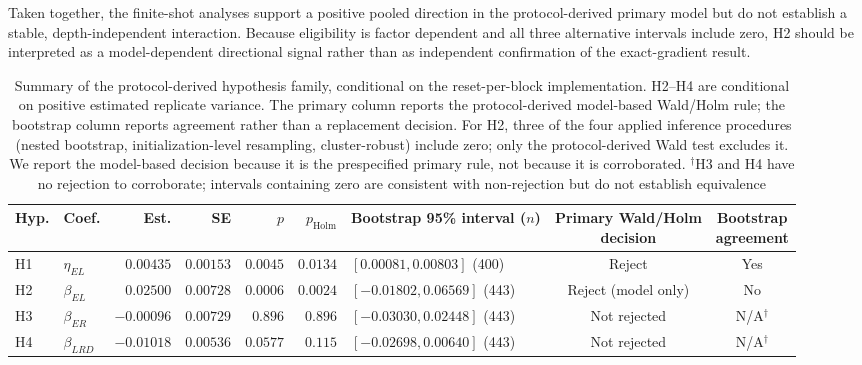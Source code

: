 \documentclass[pdflatex,sn-basic,Numbered]{sn-jnl}
\begin{document}
Taken together, the finite-shot analyses support a positive pooled direction in the protocol-derived primary model but do not establish a stable, depth-independent interaction. Because eligibility is factor dependent and all three alternative intervals include zero, H2 should be interpreted as a model-dependent directional signal rather than as independent confirmation of the exact-gradient result.

\begin{table}[t]
\centering
\footnotesize
\setlength{\tabcolsep}{3pt}
\renewcommand{\arraystretch}{1.12}
\begin{tabularx}{\textwidth}{@{}llrrrr>{\raggedright\arraybackslash}Xcc@{}}
\toprule
Hyp. & Coef. & Est. & SE & $p$ & $p_{\mathrm{Holm}}$ & Bootstrap 95\% interval ($n$) & \shortstack{Primary Wald/Holm\\decision} & \shortstack{Bootstrap\\agreement} \\
\midrule
H1 & $\eta_{EL}$ & $0.00435$ & $0.00153$ & $0.0045$ & $0.0134$ & $[0.00081,0.00803]$ (400) & Reject & Yes \\
H2 & $\beta_{EL}$ & $0.02500$ & $0.00728$ & $0.0006$ & $0.0024$ & $[-0.01802,0.06569]$ (443) & Reject (model only) & No \\
H3 & $\beta_{ER}$ & $-0.00096$ & $0.00729$ & $0.896$ & $0.896$ & $[-0.03030,0.02448]$ (443) & Not rejected & N/A$^\dagger$ \\
H4 & $\beta_{LRD}$ & $-0.01018$ & $0.00536$ & $0.0577$ & $0.115$ & $[-0.02698,0.00640]$ (443) & Not rejected & N/A$^\dagger$ \\
\bottomrule
\end{tabularx}
\caption{Summary of the protocol-derived hypothesis family, conditional on the reset-per-block implementation. H2--H4 are conditional on positive estimated replicate variance. The primary column reports the protocol-derived model-based Wald/Holm rule; the bootstrap column reports agreement rather than a replacement decision. For H2, three of the four applied inference procedures (nested bootstrap, initialization-level resampling, cluster-robust) include zero; only the protocol-derived Wald test excludes it. We report the model-based decision because it is the prespecified primary rule, not because it is corroborated. $^\dagger$H3 and H4 have no rejection to corroborate; intervals containing zero are consistent with non-rejection but do not establish equivalence}
\label{tab:confirmatory-summary}
\end{table}
\end{document}

